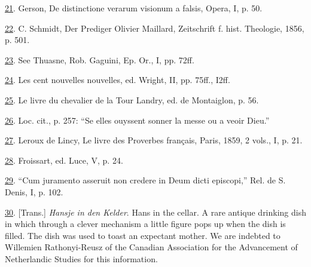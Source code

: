 \protect\hypertarget{23_NOTES.xhtmlux5cux23id_1230}{\protect\hyperlink{13_Chapter_Six__THE_DEPICTION_OF_TH.xhtmlux5cux23id_1229}{21}}.
Gerson, De distinctione verarum visionum a falsis, Opera, I, p. 50.

\protect\hypertarget{23_NOTES.xhtmlux5cux23id_1228}{\protect\hyperlink{13_Chapter_Six__THE_DEPICTION_OF_TH.xhtmlux5cux23id_1227}{22}}.
C. Schmidt, Der Prediger Olivier Maillard, Zeitschrift f. hist.
Theologie, 1856, p. 501.

\protect\hypertarget{23_NOTES.xhtmlux5cux23id_1226}{\protect\hyperlink{13_Chapter_Six__THE_DEPICTION_OF_TH.xhtmlux5cux23id_1225}{23}}.
See Thuasne, Rob. Gaguini, Ep. Or., I, pp. 72ff.

\protect\hypertarget{23_NOTES.xhtmlux5cux23id_1224}{\protect\hyperlink{13_Chapter_Six__THE_DEPICTION_OF_TH.xhtmlux5cux23id_1223}{24}}.
Les cent nouvelles nouvelles, ed. Wright, II, pp. 75ff., I2ff.

\protect\hypertarget{23_NOTES.xhtmlux5cux23id_1222}{\protect\hyperlink{13_Chapter_Six__THE_DEPICTION_OF_TH.xhtmlux5cux23id_1221}{25}}.
Le livre du chevalier de la Tour Landry, ed. de Montaiglon, p. 56.

\protect\hypertarget{23_NOTES.xhtmlux5cux23id_1220}{\protect\hyperlink{13_Chapter_Six__THE_DEPICTION_OF_TH.xhtmlux5cux23id_1219}{26}}.
Loc. cit., p. 257: ``Se elles ouyssent sonner la messe ou a veoir
Dieu.''

\protect\hypertarget{23_NOTES.xhtmlux5cux23id_1218}{\protect\hyperlink{13_Chapter_Six__THE_DEPICTION_OF_TH.xhtmlux5cux23id_1217}{27}}.
Leroux de Lincy, Le livre des Proverbes français, Paris, 1859, 2 vols.,
I, p. 21.

\protect\hypertarget{23_NOTES.xhtmlux5cux23id_1216}{\protect\hyperlink{13_Chapter_Six__THE_DEPICTION_OF_TH.xhtmlux5cux23id_1215}{28}}.
Froissart, ed. Luce, V, p. 24.

\protect\hypertarget{23_NOTES.xhtmlux5cux23id_1214}{\protect\hyperlink{13_Chapter_Six__THE_DEPICTION_OF_TH.xhtmlux5cux23id_1213}{29}}.
``Cum juramento asseruit non credere in Deum dicti episcopi,'' Rel. de
S. Denis, I, p. 102.

\protect\hypertarget{23_NOTES.xhtmlux5cux23id_1212}{\protect\hyperlink{13_Chapter_Six__THE_DEPICTION_OF_TH.xhtmlux5cux23id_1211}{30}}.
{[}Trans.{]} \emph{Hansje in den Kelder}. Hans in the cellar. A rare
antique drinking dish in which through a clever mechanism a little
figure pops up when the dish is filled. The dish was used to toast an
expectant mother. We are indebted to Willemien Rathonyi-Reusz of the
Canadian Association for the Advancement of Netherlandic Studies for
this information.

